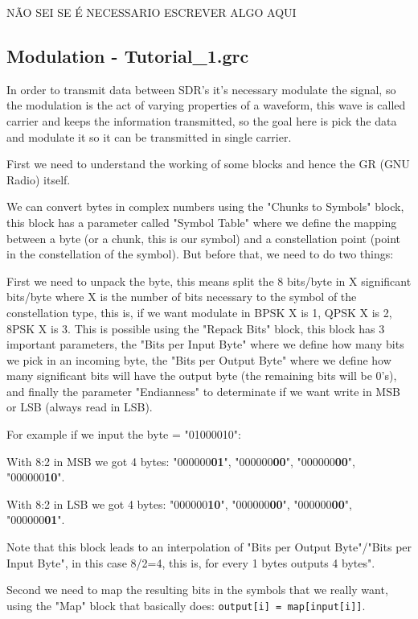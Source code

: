 \documentclass[a4paper, 10pt, conference]{ieeeconf}      %
\begin{document}
NÃO SEI SE É NECESSARIO ESCREVER ALGO AQUI 

\subsection{Modulation - Tutorial\_1.grc}
    In order to transmit data between SDR's it's necessary modulate the signal, so the modulation is the act of varying properties of a waveform, this wave is called carrier and keeps the information transmitted, so the goal here is pick the data and modulate it so it can be transmitted in single carrier.
    
    First we need to understand the working of some blocks and hence the GR (GNU Radio) itself. 
    
    
    We can convert bytes in complex numbers using the "Chunks to Symbols" block, this block has a parameter called "Symbol Table" where we define the mapping between a byte (or a chunk, this is our symbol) and a constellation point (point in the constellation of the symbol). But before that, we need to do two things:
        
        First we need to unpack the byte, this means split the 8 bits/byte in X significant bits/byte where X is the number of bits necessary to the symbol of the constellation type, this is, if we want modulate in BPSK X is 1, QPSK X is 2, 8PSK X is 3.
        This is possible using the "Repack Bits" block, this block has 3 important parameters, the "Bits per Input Byte" where we define how many bits we pick in an incoming byte, the "Bits per Output Byte" where we define how many significant bits will have the output byte (the remaining bits will be 0's), and finally the parameter "Endianness" to determinate if we want write in MSB or LSB (always read in LSB). 
    
    For example if we input the byte = "01000010":
    
    With 8:2 in MSB we got 4 bytes: "000000\textbf{01}", "000000\textbf{00}", "000000\textbf{00}", "000000\textbf{10}".
    
    With 8:2 in LSB we got 4 bytes: "000000\textbf{10}", "000000\textbf{00}", "000000\textbf{00}", "000000\textbf{01}".
    
    Note that this block leads to an interpolation of "Bits per Output Byte"/"Bits per Input Byte", in this case 8/2=4, this is, for every 1 bytes outputs 4 bytes". 
        
        Second we need to map the resulting bits in the symbols that we really want, using the "Map" block that basically does: \verb|output[i] = map[input[i]]|.
    
\end{document}
